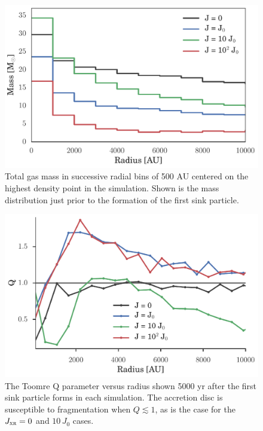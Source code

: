 \documentclass[../thesis.tex]{subfiles}
\begin{document}
\begin{figure}
  \begin{center}
    \includegraphics[width=\columnwidth]{figures/radial_bins/mass_bins}
    \caption{Total gas mass in successive radial bins of 500 AU centered on the highest density point in the simulation.  Shown is the mass distribution just prior to the formation of the first sink particle.}
    \label{mbins}
  \end{center}
\end{figure}

\begin{figure}
  \begin{center}
    \includegraphics[width=\columnwidth]{figures/radial_bins/toomreQ}
    \caption{The Toomre Q parameter versus radius shown 5000 yr after the first sink particle forms in each simulation.  The accretion disc is susceptible to fragmentation when $Q\lesssim1$, as is the case for the  $J_{\textsc{xr}}= 0$ and $10\,J_0$ cases.}
    \label{toomreQ}
  \end{center}
\end{figure}
\end{document}
